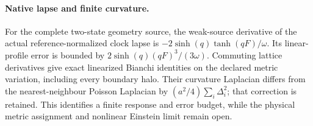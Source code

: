 \paragraph{Native lapse and finite curvature.}
For the complete two-state geometry source, the weak-source derivative of
the actual reference-normalized clock lapse is
$-2\sinh(q)\tanh(qF)/\omega$.
Its linear-profile error is bounded by
$2\sinh(q)(qF)^3/(3\omega)$.
Commuting lattice derivatives give exact linearized Bianchi identities on
the declared metric variation, including every boundary halo. Their
curvature Laplacian differs from the nearest-neighbour Poisson Laplacian by
$(a^2/4)\sum_i\Delta_i^2$; that correction is retained. This identifies a
finite response and error budget, while the physical metric assignment and
nonlinear Einstein limit remain open.
